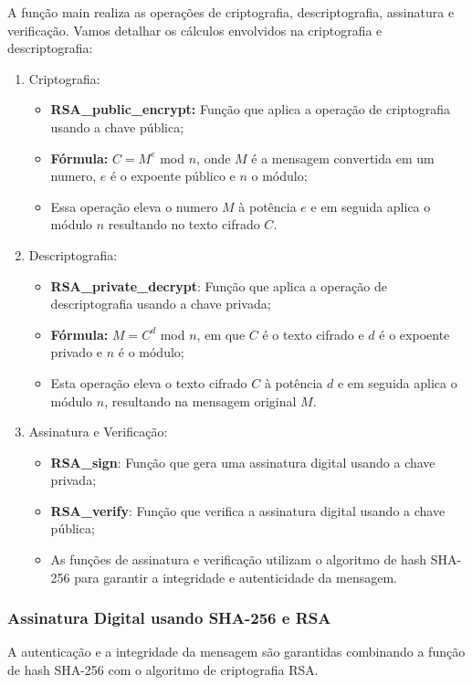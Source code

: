 \documentclass[a4paper,12pt]{article}
\begin{document}
A função main realiza as operações de criptografia, descriptografia, assinatura e verificação. Vamos detalhar os cálculos envolvidos na criptografia e descriptografia:

\begin{enumerate}
    \item Criptografia:
        \begin{itemize}
            \item \textbf{RSA\_public\_encrypt:} Função que aplica a operação de criptografia usando a chave pública;
            \item \textbf{Fórmula:} \(C = M^{e}\) mod \(n\), onde \(M\) é a mensagem convertida em um numero, \(e\) é o expoente público e \(n\) o módulo;
            \item Essa operação eleva o numero \(M\) à potência \(e\) e em seguida aplica o módulo \(n\) resultando no texto cifrado \(C\).
        \end{itemize}
    \item Descriptografia:
        \begin{itemize}
            \item \textbf{RSA\_private\_decrypt}: Função que aplica a operação de descriptografia usando a chave privada;
            \item \textbf{Fórmula:} \(M = C^{d}\) mod \(n\), em que \(C\) é o texto cifrado e \(d\) é o expoente privado e \(n\) é o módulo;
            \item Esta operação eleva o texto cifrado \(C\) à potência \(d\) e em seguida aplica o módulo \(n\), resultando na mensagem original \(M\).
        \end{itemize}
    \item Assinatura e Verificação:
        \begin{itemize}
            \item \textbf{RSA\_sign}: Função que gera uma assinatura digital usando a chave privada;
            \item \textbf{RSA\_verify}: Função que verifica a assinatura digital usando a chave pública;
            \item As funções de assinatura e verificação utilizam o algoritmo de hash SHA-256 para garantir a integridade e autenticidade da mensagem.
        \end{itemize}
\end{enumerate}

\subsubsection*{Assinatura Digital usando SHA-256 e RSA}
A autenticação e a integridade da mensagem são garantidas combinando a função de hash SHA-256 com o algoritmo de criptografia RSA.
\end{document}
